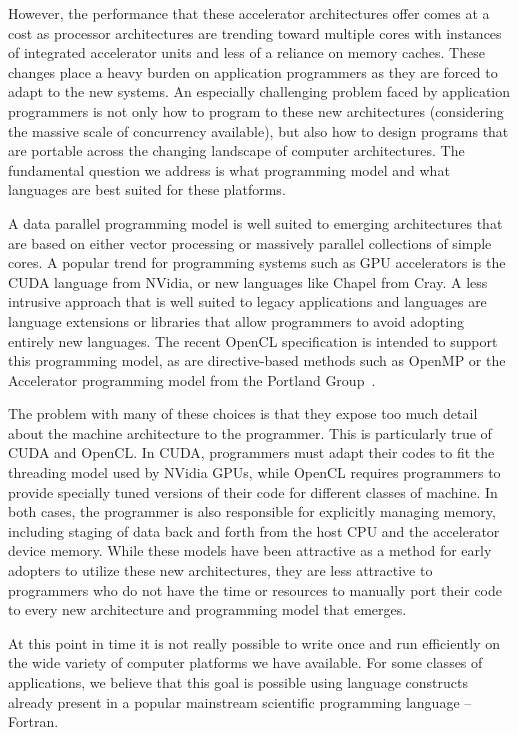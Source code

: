 \documentclass[10pt, conference, compsocconf]{IEEEtran}
\begin{document}
However, the performance that these accelerator architectures offer comes at a
cost as processor architectures are trending toward multiple cores with
instances of integrated accelerator units and less of a reliance on memory
caches.  These changes place a heavy burden on application programmers as they
are forced to adapt to the new systems.  An especially challenging problem
faced by application programmers is not only how to program to these new
architectures (considering the massive scale of concurrency available), but
also how to design programs that are portable across the changing landscape of
computer architectures.  The fundamental question we address is what
programming model and what languages are best suited for these platforms.

A data parallel programming model is well suited to emerging
architectures that are based on either vector processing or massively
parallel collections of simple cores.  A popular trend for programming
systems such as GPU accelerators is the CUDA language from NVidia, or
new languages like Chapel from Cray.  A less intrusive approach that
is well suited to legacy applications and languages are language
extensions or libraries that allow programmers to avoid adopting
entirely new languages.  The recent OpenCL specification is intended
to support this programming model, as are directive-based methods such
as OpenMP or the Accelerator programming model from the Portland
Group~\cite{pgi10accelerator}.

The problem with many of these choices is that they expose too much detail
about the machine architecture to the programmer.  
This is particularly true of CUDA and OpenCL.  In CUDA, programmers must
adapt their codes to fit the threading model used by NVidia GPUs, while
OpenCL requires programmers to provide specially tuned versions of
their code for different classes of machine.  In both cases, the programmer
is also responsible for explicitly managing memory, including staging of
data back and forth from the host CPU and the accelerator device memory.
While these models have been attractive as a method for early adopters
to utilize these new architectures, they are less attractive to programmers
who do not have the time or resources to manually port their code to every
new architecture and programming model that emerges.

At this point in time it is not really possible to write once and
run efficiently on the wide variety of computer platforms we have
available.  For some classes of applications, we believe that this goal
is possible using language constructs already present in a popular
mainstream scientific programming language -- Fortran.
\end{document}
